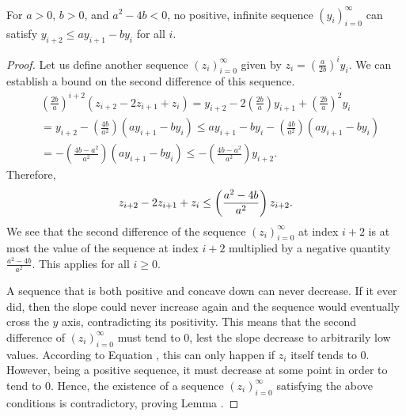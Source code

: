 \begin{lemma} 
For $a>0$, $b>0$, and $a^2-4b<0$, no positive, infinite sequence $\left(y_i\right)_{i=0}^{\infty}$ can satisfy $y_{i+2}\leq ay_{i+1}-by_i$ for all $i$.
\end{lemma}
\begin{appendixonly}
  \begin{proof}
  Let us define another sequence $\left(z_i\right)_{i=0}^{\infty}$ given by $z_i = \left(\frac{a}{2b}\right)^iy_i$. We can establish a bound on the second difference of this sequence.
  \begin{align*}
    & \left(\frac{2b}{a}\right)^{i+2}\left(z_{i+2}-2z_{i+1}+z_i\right) 
    = y_{i+2}-2\left(\frac{2b}{a}\right)y_{i+1}+\left(\frac{2b}{a}\right)^2y_i \\
    &= y_{i+2}-\left(\frac{4b}{a^2}\right)\left(ay_{i+1}-by_i\right) 
    \leq ay_{i+1}-by_i-\left(\frac{4b}{a^2}\right)\left(ay_{i+1}-by_i\right) \\
    &= -\left(\frac{4b-a^2}{a^2}\right)\left(ay_{i+1}-by_i\right) 
    \leq -\left(\frac{4b-a^2}{a^2}\right)y_{i+2} .
  \end{align*}
  Therefore,
  \begin{equation}
    z_{i+2}-2z_{i+1}+z_i \leq \left(\frac{a^2-4b}{a^2}\right)z_{i+2} . \mylabel{eq:general_becknewman_max_concav}
  \end{equation}
  We see that the second difference of the sequence $\left(z_i\right)_{i=0}^{\infty}$ at index $i+2$ is at most the value of the sequence at index $i+2$ multiplied by a negative quantity $\frac{a^2-4b}{a^2}$. This applies for all $i\geq 0$.

  A sequence that is both positive and concave down can never decrease. If it ever did, then the slope could never increase again and the sequence would eventually cross the $y$ axis, contradicting its positivity. This means that the second difference of $\left(z_i\right)_{i=0}^{\infty}$ must tend to $0$, lest the slope decrease to arbitrarily low values. According to Equation , this can only happen if $z_i$ itself tends to $0$. However, being a positive sequence, it must decrease at some point in order to tend to $0$. Hence, the existence of a sequence $\left(z_i\right)_{i=0}^{\infty}$ satisfying the above conditions is contradictory, proving Lemma .
  \end{proof}
\end{appendixonly}

